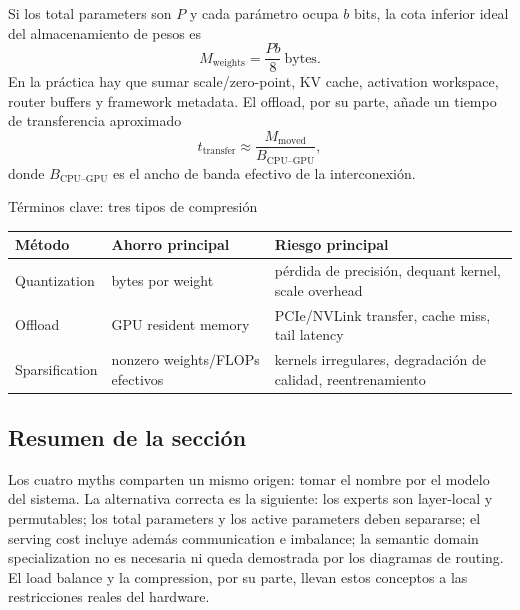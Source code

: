 Si los total parameters son $P$ y cada parámetro ocupa $b$ bits, la cota inferior ideal del almacenamiento de pesos es
\[
M_{\text{weights}}=\frac{Pb}{8}\ \text{bytes}.
\]
En la práctica hay que sumar scale/zero-point, KV cache, activation workspace, router buffers y framework metadata. El offload, por su parte, añade un tiempo de transferencia aproximado
\[
t_{\text{transfer}}\approx \frac{M_{\text{moved}}}{B_{\text{CPU--GPU}}},
\]
donde $B_{\text{CPU--GPU}}$ es el ancho de banda efectivo de la interconexión.

\begin{knowledgebox}{Términos clave: tres tipos de compresión}
\begin{tabularx}{\textwidth}{L{0.18\textwidth} L{0.24\textwidth} X}
\toprule
Método & Ahorro principal & Riesgo principal \\
\midrule
Quantization & bytes por weight & pérdida de precisión, dequant kernel, scale overhead \\
Offload & GPU resident memory & PCIe/NVLink transfer, cache miss, tail latency \\
Sparsification & nonzero weights/FLOPs efectivos & kernels irregulares, degradación de calidad, reentrenamiento \\
\bottomrule
\end{tabularx}
\end{knowledgebox}


\subsection{Resumen de la sección}

Los cuatro myths comparten un mismo origen: tomar el nombre por el modelo del sistema. La alternativa correcta es la siguiente: los experts son layer-local y permutables; los total parameters y los active parameters deben separarse; el serving cost incluye además communication e imbalance; la semantic domain specialization no es necesaria ni queda demostrada por los diagramas de routing. El load balance y la compression, por su parte, llevan estos conceptos a las restricciones reales del hardware.
